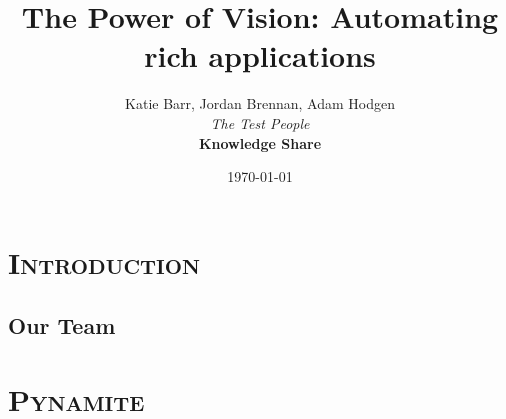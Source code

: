 \documentclass[xcolor=x11names,compress]{beamer}
\renewcommand{\(}{\begin{columns}}
\renewcommand{\)}{\end{columns}}
\newcommand{\<}[1]{\begin{column}{#1}}
\renewcommand{\>}{\end{column}}
\begin{document}
\begin{frame}
\title{The Power of Vision: \n Automating rich applications}    %
\author{Katie Barr, Jordan Brennan, Adam Hodgen \\
{\it The Test People}\\   \vspace{3mm}  
\textbf{ \small Knowledge Share}\\
}             %
\date{\today}
\titlepage
\end{frame}


\section{ \scshape Introduction}

\subsection{Our Team}
\begin{frame}

\frametitle{}

\end{frame}

\subsection{}
\begin{frame}
\frametitle{}


\end{frame}

\begin{frame}
\frametitle{}

 
\end{frame}

\begin{frame}
\frametitle{}

\end{frame}

\begin{frame}
\frametitle{}
\end{frame}
 
\begin{frame}
\frametitle{}

\end{frame}

\section{ \scshape Pynamite}
\end{document}
